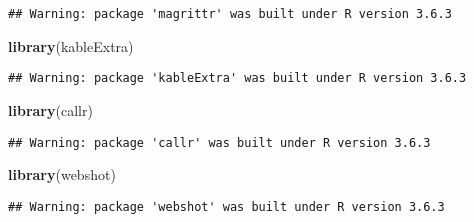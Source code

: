 \documentclass[
]{article}
\newenvironment{Shaded}{\begin{snugshade}}{\end{snugshade}}
\newcommand{\CommentTok}[1]{\textcolor[rgb]{0.56,0.35,0.01}{\textit{#1}}}
\newcommand{\DataTypeTok}[1]{\textcolor[rgb]{0.13,0.29,0.53}{#1}}
\newcommand{\DecValTok}[1]{\textcolor[rgb]{0.00,0.00,0.81}{#1}}
\newcommand{\KeywordTok}[1]{\textcolor[rgb]{0.13,0.29,0.53}{\textbf{#1}}}
\newcommand{\NormalTok}[1]{#1}
\newcommand{\OperatorTok}[1]{\textcolor[rgb]{0.81,0.36,0.00}{\textbf{#1}}}
\newcommand{\OtherTok}[1]{\textcolor[rgb]{0.56,0.35,0.01}{#1}}
\newcommand{\StringTok}[1]{\textcolor[rgb]{0.31,0.60,0.02}{#1}}
\begin{document}
\begin{verbatim}
## Warning: package 'magrittr' was built under R version 3.6.3
\end{verbatim}

\begin{Shaded}
\begin{Highlighting}[]
\KeywordTok{library}\NormalTok{(kableExtra)}
\end{Highlighting}
\end{Shaded}

\begin{verbatim}
## Warning: package 'kableExtra' was built under R version 3.6.3
\end{verbatim}

\begin{Shaded}
\begin{Highlighting}[]
\KeywordTok{library}\NormalTok{(callr)}
\end{Highlighting}
\end{Shaded}

\begin{verbatim}
## Warning: package 'callr' was built under R version 3.6.3
\end{verbatim}

\begin{Shaded}
\begin{Highlighting}[]
\KeywordTok{library}\NormalTok{(webshot)}
\end{Highlighting}
\end{Shaded}

\begin{verbatim}
## Warning: package 'webshot' was built under R version 3.6.3
\end{verbatim}

\begin{Shaded}
\end{Shaded}
\end{document}
